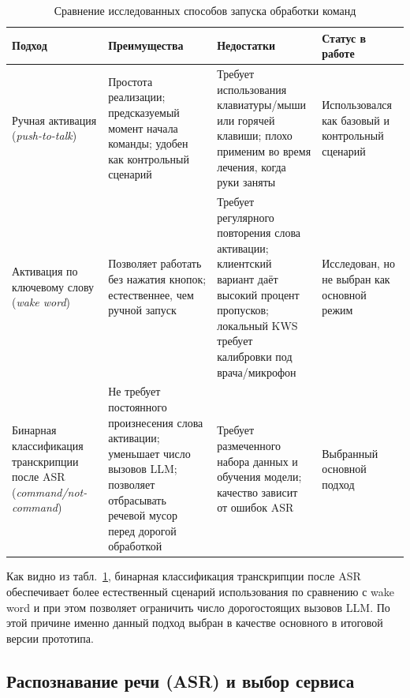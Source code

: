 \begin{table}[t]
    \centering
    \caption{Сравнение исследованных способов запуска обработки команд}
    \label{tab:activation_compare}
    \begin{tabularx}{\textwidth}{|X|X|X|X|}

    \hline
    \textbf{Подход} & \textbf{Преимущества} & \textbf{Недостатки} & \textbf{Статус в работе} \\
    \hline

    Ручная активация (\textit{push-to-talk}) &
    Простота реализации; предсказуемый момент начала команды; удобен как контрольный сценарий &
    Требует использования клавиатуры/мыши или горячей клавиши; плохо применим во время лечения, когда руки заняты &
    Использовался как базовый и контрольный сценарий \\

    \hline

    Активация по ключевому слову (\textit{wake word}) &
    Позволяет работать без нажатия кнопок; естественнее, чем ручной запуск &
    Требует регулярного повторения слова активации; клиентский вариант даёт высокий процент пропусков; локальный KWS требует калибровки под врача/микрофон &
    Исследован, но не выбран как основной режим \\

    \hline

    Бинарная классификация транскрипции после ASR (\textit{command/not-command}) &
    Не требует постоянного произнесения слова активации; уменьшает число вызовов LLM; позволяет отбрасывать речевой мусор перед дорогой обработкой &
    Требует размеченного набора данных и обучения модели; качество зависит от ошибок ASR &
    Выбранный основной подход \\

    \hline
    \end{tabularx}
\end{table}

Как видно из табл.~\ref{tab:activation_compare}, бинарная классификация транскрипции
после ASR обеспечивает более естественный сценарий использования по сравнению с wake word
и при этом позволяет ограничить число дорогостоящих вызовов LLM. По этой причине
именно данный подход выбран в качестве основного в итоговой версии прототипа.

\subsection{Распознавание речи (ASR) и выбор сервиса}

